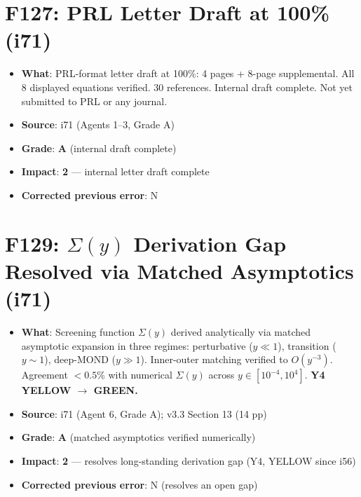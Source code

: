 \documentclass[11pt,a4paper]{article}
\newcommand{\grade}[1]{\textbf{#1}}
\newcommand{\impact}[1]{\textbf{#1}}
\begin{document}
\section{F127: PRL Letter Draft at 100\% (i71)}
\begin{itemize}[nosep]
\item \textbf{What}: PRL-format letter draft at 100\%: 4 pages + 8-page supplemental. All 8 displayed equations verified. 30 references. Internal draft complete. Not yet submitted to PRL or any journal.
\item \textbf{Source}: i71 (Agents 1--3, Grade A)
\item \textbf{Grade}: \grade{A} (internal draft complete)
\item \textbf{Impact}: \impact{2} --- internal letter draft complete
\item \textbf{Corrected previous error}: N
\end{itemize}


\section{F129: $\Sigma(y)$ Derivation Gap Resolved via Matched Asymptotics (i71)}
\begin{itemize}[nosep]
\item \textbf{What}: Screening function $\Sigma(y)$ derived analytically via matched asymptotic expansion in three regimes: perturbative ($y \ll 1$), transition ($y \sim 1$), deep-MOND ($y \gg 1$). Inner-outer matching verified to $O(y^{-3})$. Agreement $<0.5\%$ with numerical $\Sigma(y)$ across $y \in [10^{-4}, 10^4]$. \textbf{Y4 YELLOW $\to$ GREEN.}
\item \textbf{Source}: i71 (Agent 6, Grade A); v3.3 Section 13 (14 pp)
\item \textbf{Grade}: \grade{A} (matched asymptotics verified numerically)
\item \textbf{Impact}: \impact{2} --- resolves long-standing derivation gap (Y4, YELLOW since i56)
\item \textbf{Corrected previous error}: N (resolves an open gap)
\end{itemize}
\end{document}
